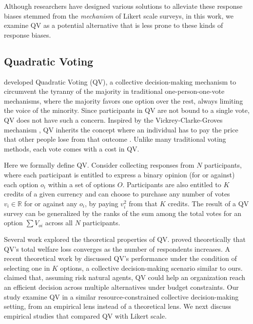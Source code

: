 Although researchers have designed various solutions to alleviate these response biases stemmed from the \textit{mechanism} of Likert scale surveys, in this work, we examine QV as a potential alternative that is less prone to these kinds of response biases.

\subsection{Quadratic Voting}
\textcite{posner2018radical} developed Quadratic Voting (QV), a collective decision-making mechanism \cite{lalley2018quadratic} to circumvent the tyranny of the majority in traditional one-person-one-vote mechanisms, where the majority favors one option over the rest, always limiting the voice of the minority. Since participants in QV are not bound to a single vote, QV does not have such a concern. Inspired by the Vickrey-Clarke-Groves mechanism \cite{roughgarden2010algorithmic}, QV inherits the concept where an individual has to pay the price that other people lose from that outcome \cite{posner2018radical}. Unlike many traditional voting methods, each vote comes with a cost in QV. 


Here we formally define QV. Consider collecting responses from $N$ participants, where each participant is entitled to express a binary opinion (for or against) each option $o_i$ within a set of options $O$. Participants are also entitled to $K$ credits of a given currency and can choose to purchase any number of votes $v_i \in \mathbb{R}$ for or against any $o_i$, by paying $v_i^2$ from that $K$ credits. The result of a QV survey can be generalized by the ranks of the sum among the total votes for an option $\sum{V_{oi}}$ across all $N$ participants.\par

Several work explored the theoretical properties of QV. \textcite{lalley2018quadratic} proved theoretically that QV's total welfare loss converges as the number of respondents increases. A recent theoretical work by \textcite{eguia2019quadratic} discussed QV's performance under the condition of selecting one in $K$ options, a collective decision-making scenario similar to ours. \cite{eguia2019quadratic} claimed that, assuming risk natural agents, QV could help an organization reach an efficient decision across multiple alternatives under budget constraints. Our study examine QV in a similar resource-constrained collective decision-making setting, from an empirical lens instead of a theoretical lens. We next discuss empirical studies that compared QV with Likert scale.


